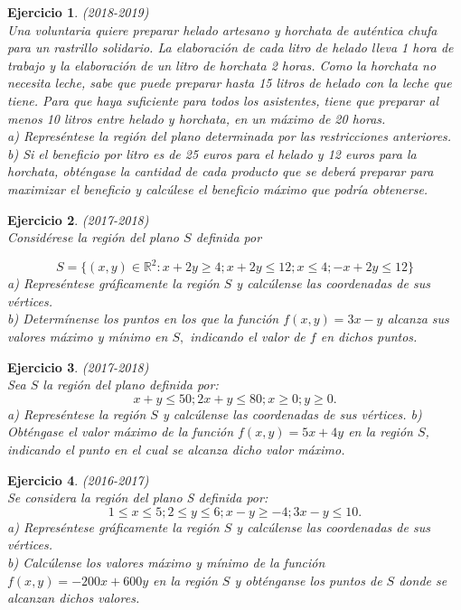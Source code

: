 \documentclass[12pt, a4paper]{amsart}
\newtheorem{ejer}{Ejercicio}
\begin{document}
\begin{ejer}\em (2018-2019)\\
Una voluntaria quiere preparar helado artesano y horchata de auténtica chufa para un rastrillo solidario. La elaboración de cada litro de helado lleva 1 hora de trabajo y la elaboración de un litro de horchata 2 horas. Como la horchata no necesita leche, sabe que puede preparar hasta 15 litros de helado con la leche que tiene. Para que haya suficiente para todos los asistentes, tiene que preparar al menos 10 litros entre helado y horchata, en un máximo de 20 horas.\\
a) Represéntese la región del plano determinada por las restricciones anteriores.\\
b) Si el beneficio por litro es de 25 euros para el helado y 12 euros para la horchata, obténgase la cantidad de cada producto que se deberá preparar para maximizar el beneficio y calcúlese el beneficio máximo que podría obtenerse.
\end{ejer}

\newpage

\begin{ejer}\em (2017-2018)\\
Considérese la región del plano $S$ definida por

\[
S=\{(x,y)\in \mathbb{R}^2: x+2y\geq 4; x+2y\leq 12; x\leq 4; -x+2y\leq 12\}
\]
a) Represéntese gráficamente la región $S$ y calcúlense las coordenadas de sus vértices.\\
b) Determínense los puntos en los que la función $f(x,y)= 3x - y$ alcanza sus valores máximo y mínimo en $S,$ indicando el valor de $f$ en dichos puntos.

\end{ejer}

\begin{ejer}\em (2017-2018)\\
Sea $S$ la región del plano definida por:
\[
x+y\leq 50 ; 2x+y\leq 80 ; x\geq 0 ; y\geq 0.
\]
a) Represéntese la región $S$ y calcúlense las coordenadas de sus vértices.
b) Obténgase el valor máximo de la función $f (x, y ) = 5x + 4y$ en la región $S$, indicando el punto en el cual se alcanza dicho valor máximo.
\end{ejer}

\begin{ejer}\em (2016-2017)\\
Se considera la región del plano S definida por:\\
\[
1\leq x\leq 5 ; 2\leq y \leq 6 ; x-y\geq -4 ; 3x-y\leq 10.
\]
a) Represéntese gráficamente la región $S$ y calcúlense las coordenadas de sus vértices.\\
b) Calcúlense los valores máximo y mínimo de la función $f (x, y) = - 200x + 600y$ en la región $S$ y obténganse los puntos de $S$ donde se alcanzan dichos valores.
\end{ejer}
\end{document}
